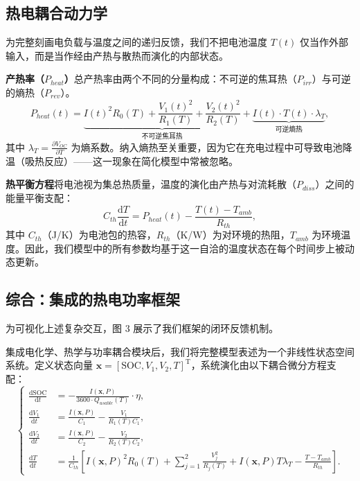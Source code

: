\documentclass[11pt,a4paper]{ctexart}
\begin{document}
\subsection{热电耦合动力学}

为完整刻画电负载与温度之间的递归反馈，我们不把电池温度 $T(t)$ 仅当作外部输入，而是当作经由产热与散热而演化的内部状态。

\noindent\textbf{产热率（$P_{heat}$）}\quad 总产热率由两个不同的分量构成：不可逆的焦耳热（$P_{irr}$）与可逆的熵热（$P_{rev}$）。
\begin{equation}
P_{heat}(t)=\underbrace{I(t)^2R_0(T)+\frac{V_1(t)^2}{R_1(T)}+\frac{V_2(t)^2}{R_2(T)}}_{\text{不可逆焦耳热}}+\underbrace{I(t)\cdot T(t)\cdot\lambda_T}_{\text{可逆熵热}},
\end{equation}
其中 $\lambda_T=\frac{\partial V_{OC}}{\partial T}$ 为熵系数。纳入熵热至关重要，因为它在充电过程中可导致电池降温（吸热反应）——这一现象在简化模型中常被忽略。

\noindent\textbf{热平衡方程}\quad 将电池视为集总热质量，温度的演化由产热与对流耗散（$P_{diss}$）之间的能量平衡支配：
\begin{equation}
C_{th}\frac{\mathrm{d}T}{\mathrm{d}t}=P_{heat}(t)-\frac{T(t)-T_{amb}}{R_{th}},
\end{equation}
其中 $C_{th}$（J/K）为电池包的热容，$R_{th}$（K/W）为对环境的热阻，$T_{amb}$ 为环境温度。因此，我们模型中的所有参数均基于这一自洽的温度状态在每个时间步上被动态更新。

\subsection{综合：集成的热电功率框架}

为可视化上述复杂交互，图 3 展示了我们框架的闭环反馈机制。

集成电化学、热学与功率耦合模块后，我们将完整模型表述为一个非线性状态空间系统。定义状态向量 $\mathbf{x}=[\mathrm{SOC},V_1,V_2,T]^{\mathrm{T}}$，系统演化由以下耦合微分方程支配：
\begin{equation}
\left\{
\begin{aligned}
\frac{\mathrm{d}\mathrm{SOC}}{\mathrm{d}t} &= -\frac{I(\mathbf{x},P)}{3600\cdot Q_{usable}(T)}\cdot\eta,\\[6pt]
\frac{\mathrm{d}V_1}{\mathrm{d}t} &= \frac{I(\mathbf{x},P)}{C_1}-\frac{V_1}{R_1(T)C_1},\\[6pt]
\frac{\mathrm{d}V_2}{\mathrm{d}t} &= \frac{I(\mathbf{x},P)}{C_2}-\frac{V_2}{R_2(T)C_2},\\[6pt]
\frac{\mathrm{d}T}{\mathrm{d}t} &= \frac{1}{C_{th}}\left[I(\mathbf{x},P)^2R_0(T)+\sum_{j=1}^{2}\frac{V_j^2}{R_j(T)}+I(\mathbf{x},P)T\lambda_T-\frac{T-T_{amb}}{R_{th}}\right].
\end{aligned}
\right.
\end{equation}
\end{document}
